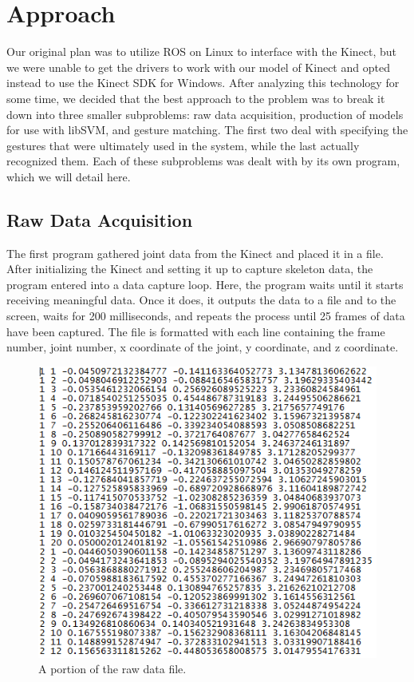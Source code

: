 \documentclass[11pt,conference]{IEEEtran}
\begin{document}
\section{Approach}
Our original plan was to utilize ROS on Linux to interface with the Kinect, but we were unable to get the drivers to work with our model of Kinect and opted instead to use the Kinect SDK for Windows. After analyzing this technology for some time, we decided that the best approach to the problem was to break it down into three smaller subproblems: raw data acquisition, production of models for use with libSVM, and gesture matching. The first two deal with specifying the gestures that were ultimately used in the system, while the last actually recognized them. Each of these subproblems was dealt with by its own program, which we will detail here.
\subsection{Raw Data Acquisition}
The first program gathered joint data from the Kinect and placed it in a file. After initializing the Kinect and setting it up to capture skeleton data, the program entered into a data capture loop. Here, the program waits until it starts receiving meaningful data. Once it does, it outputs the data to a file and to the screen, waits for 200 milliseconds, and repeats the process until 25 frames of data have been captured. The file is formatted with each line containing the frame number, joint number, x coordinate of the joint, y coordinate, and z coordinate.

\begin{figure}[h]
\caption{A portion of the raw data file.}
\centering
\includegraphics{raw_data}
\end{figure}
\end{document}
